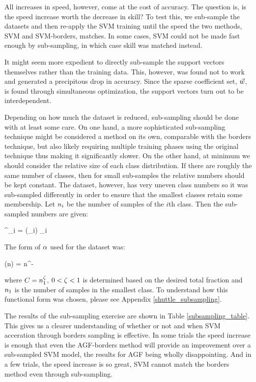All increases in speed, however, come at the cost of accuracy.
The question is, is the speed increase worth the decrease in skill?
To test this, we sub-sample the datasets and then re-apply the SVM training
until the speed the two methods, SVM and SVM-borders, matches.
In some cases, SVM could not be made fast enough by sub-sampling, in which
case skill was matched instead.

It might seem more expedient to directly sub-sample the support vectors themselves
rather than the training data.
This, however, was found not to work and generated a precipitous drop in accuracy. 
Since the sparse coefficient set, $\vec {w}$, is found through simultaneous 
optimization, the support vectors turn out to be interdependent.

Depending on how much the dataset is reduced, sub-sampling should be done with at
least some care. 
On one hand, a more sophisticated sub-sampling technique might be considered a method on its own, 
comparable with the borders technique, but also likely requiring multiple training phases using the
original technique thus making it significantly slower.
On the other hand, at minimum we should consider the relative size of each class distribution.
If there are roughly the same number of classes, then for small sub-samples the relative
numbers should be kept constant.
The  dataset, however, has very uneven class numbers so it was sub-sampled differently
in order to ensure that the smallest classes retain some membership.
Let $n_i$ be the number of samples of the $i$th class.
Then the sub-sampled numbers are given:
\begin{eqnnon}
	\classsize^\prime_i = \subsample(\classsize_i) \classsize_i
	\label{subsample}
\end{eqnnon}
The form of $\alpha$ used for the  dataset was:
\begin{eqnnon}
	\subsample(n) = \submultcoef n^{-\subexp}
	\label{subfunction}
\end{eqnnon}
where $C=n_1^\zeta$, $0 < \zeta < 1$ is determined based on the
desired total fraction and $n_1$ is the number of samples in the 
smallest class.
To understand how this functional form was chosen, please see Appendix \ref{shuttle_subsampling}.

The results of the sub-sampling exercise are shown in Table \ref{subsampling_table}.
This gives us a clearer understanding of whether or not and
when SVM acceration through borders sampling is effective.
In some trials the speed increase is enough that even the AGF-borders method will provide an
improvement over a sub-sampled SVM model, the results for AGF being wholly
disappointing.
And in a few trials, the speed increase is so great, SVM cannot match the borders
method even through sub-sampling.

